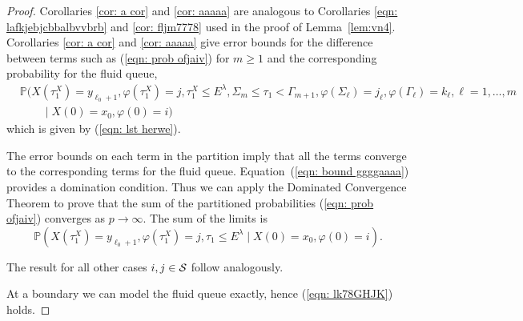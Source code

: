 \begin{proof}
	Corollaries \ref{cor: a cor} and \ref{cor: aaaaa} are analogous to Corollaries \ref{eqn: lafkjebjcbbalbvvbrb} and \ref{cor: fljm7778} used in the proof of Lemma~\ref{lem:vn4}. Corollaries \ref{cor: a cor} and \ref{cor: aaaaa} give error bounds for the difference between terms such as (\ref{eqn: prob ofjaiv}) for \(m\geq 1\) and the corresponding probability for the fluid queue, 
	\begin{align}
		&\mathbb P(X(\tau_1^X)=y_{\ell_0+1},\varphi(\tau_1^X)=j,\tau_1^X\leq E^\lambda, \Sigma_{m}\leq \tau_1<\Gamma_{m+1}, \varphi(\Sigma_\ell) = j_\ell, \varphi(\Gamma_\ell)=k_\ell, \ell = 1,\dots, m  \nonumber 
		\\&\qquad{} \mid X(0)=x_0, \varphi(0)=i)
	\end{align}
	which is given by (\ref{eqn: lst herwe}). 
	
	The error bounds on each term in the partition imply that all the terms converge to the corresponding terms for the fluid queue. Equation~(\ref{eqn: bound ggggaaaa}) provides a domination condition. Thus we can apply the Dominated Convergence Theorem to prove that the sum of the partitioned probabilities (\ref{eqn: prob ofjaiv}) converges as \(p\to\infty\). The sum of the limits is 
	\[\mathbb P(X(\tau_1^X) = y_{\ell_0+1}, \varphi(\tau_1^X) = j, \tau_{1}\leq E^\lambda 
            	 \mid X(0) = x_0, \varphi(0) = i).\]
	 
	 The result for all other cases \(i,j\in\mathcal{S}\) follow analogously.
	
	At a boundary we can model the fluid queue exactly, hence (\ref{eqn: lk78GHJK}) holds.
	

\end{proof}
